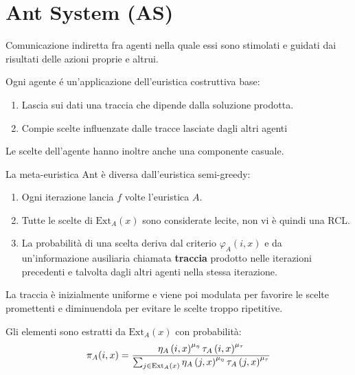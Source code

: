 \documentclass[\main/main.tex]{subfiles}
\providecommand{\Ext}{\text{Ext}_A}
\begin{document}
\section{Ant System (AS)}
\begin{multicols}{2}
\begin{definition}[Stigmergia]
    Comunicazione indiretta fra agenti nella quale essi sono stimolati e guidati dai risultati delle azioni proprie e altrui.
\end{definition}
\begin{definition}[Agente]
    Ogni agente é un'applicazione dell'euristica costruttiva base:
    \begin{enumerate}
        \item Lascia sui dati una traccia che dipende dalla soluzione prodotta.
        \item Compie scelte influenzate dalle tracce lasciate dagli altri agenti
    \end{enumerate}
    Le scelte dell'agente hanno inoltre anche una componente casuale.   
\end{definition}
\begin{observation}
    La meta-euristica Ant è diversa dall'euristica semi-greedy:
    \begin{enumerate}
        \item Ogni iterazione lancia \(f\) volte l'euristica \(A\).
        \item Tutte le scelte di \(\Ext(x)\) sono considerate lecite, non vi è quindi una RCL.
        \item La probabilità di una scelta deriva dal criterio \(\varphi_A(i, x)\) e da un'informazione ausiliaria chiamata \textbf{traccia} prodotto nelle iterazioni precedenti e talvolta dagli altri agenti nella stessa iterazione.
    \end{enumerate}
\end{observation}
\begin{observation}
    La traccia è inizialmente uniforme e viene poi modulata per favorire le scelte promettenti e diminuendola per evitare le scelte troppo ripetitive.
\end{observation}
\begin{observation}
    Gli elementi sono estratti da \(\Ext(x)\) con probabilità:
    \[
        \pi_A(i, x) = \frac{\eta_A\rnd{i, x}^{\mu_\eta} \tau_A\rnd{i, x}^{\mu_\tau}}{\sum_{j \in \Ext(x)} \eta_A\rnd{j, x}^{\mu_\eta} \tau_A\rnd{j, x}^{\mu_\tau}}
\]
\end{observation}
\end{multicols}
\end{document}
